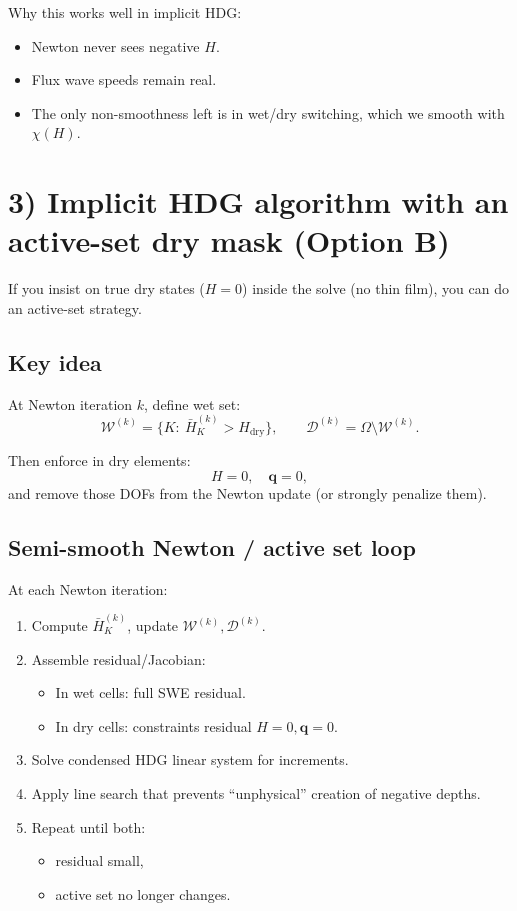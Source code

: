 \documentclass[11pt]{article}
\begin{document}
Why this works well in implicit HDG:
\begin{itemize}
\item Newton never sees negative $H$.
\item Flux wave speeds remain real.
\item The only non-smoothness left is in wet/dry switching, which we smooth with $\chi(H)$.
\end{itemize}

\section*{3) Implicit HDG algorithm with an active-set dry mask (Option B)}

If you insist on true dry states ($H=0$) inside the solve (no thin film), you can do an active-set strategy.

\subsection*{Key idea}

At Newton iteration $k$, define wet set:
\[
\mathcal{W}^{(k)}=\{K:\ \bar H_K^{(k)} > H_{\text{dry}}\},\qquad
\mathcal{D}^{(k)}=\Omega\setminus\mathcal{W}^{(k)}.
\]

Then enforce in dry elements:
\[
H=0,\quad \mathbf{q}=0,
\]
and remove those DOFs from the Newton update (or strongly penalize them).

\subsection*{Semi-smooth Newton / active set loop}

At each Newton iteration:
\begin{enumerate}
\item Compute $\bar H_K^{(k)}$, update $\mathcal{W}^{(k)},\mathcal{D}^{(k)}$.
\item Assemble residual/Jacobian:
\begin{itemize}
\item In wet cells: full SWE residual.
\item In dry cells: constraints residual $H=0,\mathbf{q}=0$.
\end{itemize}
\item Solve condensed HDG linear system for increments.
\item Apply line search that prevents ``unphysical'' creation of negative depths.
\item Repeat until both:
\begin{itemize}
\item residual small,
\item active set no longer changes.
\end{itemize}
\end{enumerate}
\end{document}
